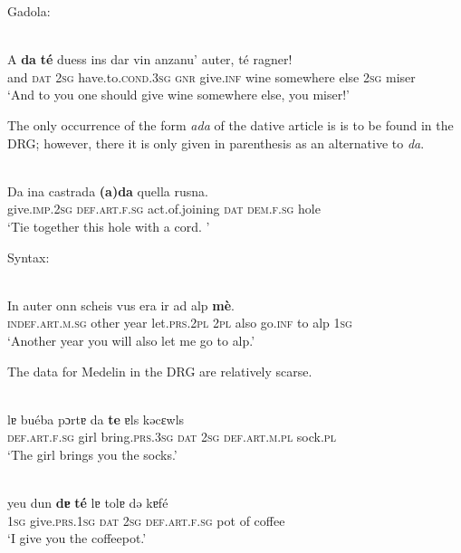 {Gadola:

\ea\label{}
\\
\gll  A \textbf{da} \textbf{té} duess ins dar vin anzanu’ auter, té ragner! \\
     and \textsc{dat} \textsc{2sg} have.to.\textsc{cond.3sg} \textsc{gnr} give.\textsc{inf} wine somewhere else \textsc{2sg} miser \\
\glt `And to you one should give wine somewhere else, you miser!'
\z

The only occurrence of the form \textit{ada} of the dative article is is to be found in the DRG; however, there it is only given in parenthesis as an alternative to \textit{da}.

\ea\label{}
\\
\gll  Da ina castrada \textbf{(a)da} quella rusna.\\
     give.\textsc{imp.2sg} \textsc{def.art.f.sg} act.of.joining \textsc{dat} \textsc{dem.f.sg} hole\\
\glt `Tie together this hole with a cord. '
\z


Syntax:

\ea\label{ex:}
\\
\gll  In auter onn scheis vus era ir ad alp \textbf{mè}. \\
     \textsc{indef.art.m.sg} other year let.\textsc{prs.2pl} \textsc{2pl} also go.\textsc{inf} to alp \textsc{1sg}\\
\glt `Another year you will also let me go to alp.'
\z


The data for Medelin in the DRG are relatively scarse.

\ea\label{}
\\
\gll  lɐ buéba pɔrtɐ da \textbf{te} ɐls kəcɛwls\\
    \textsc{def.art.f.sg} girl bring.\textsc{prs.3sg} \textsc{dat} \textsc{2sg} \textsc{def.art.m.pl} sock.\textsc{pl}\\
\glt `The girl brings you the socks.'
\z

\ea\label{}
\\
\gll   yeu dun \textbf{dɐ} \textbf{té} lɐ tolɐ də kɐfé \\
     \textsc{1sg} give.\textsc{prs.1sg} \textsc{dat} \textsc{2sg} \textsc{def.art.f.sg}  pot of coffee\\
\glt `I give you the coffeepot.'
\z


}
